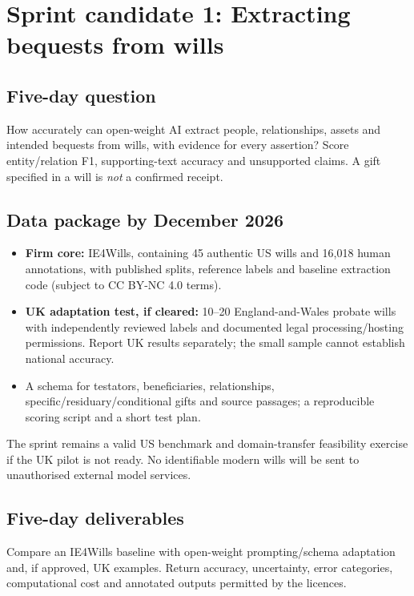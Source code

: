 \section{Sprint candidate 1: Extracting bequests from wills}
\label{sec:wills}

\subsection{Five-day question}
How accurately can open-weight AI extract people, relationships, assets and intended bequests from wills, with evidence for every assertion? Score entity/relation F1, supporting-text accuracy and unsupported claims. A gift specified in a will is \emph{not} a confirmed receipt.

\subsection{Data package by December 2026}
\begin{itemize}[nosep]
\item \textbf{Firm core:} IE4Wills, containing 45 authentic US wills and 16,018 human annotations, with published splits, reference labels and baseline extraction code (subject to CC BY-NC 4.0 terms).
\item \textbf{UK adaptation test, if cleared:} 10--20 England-and-Wales probate wills with independently reviewed labels and documented legal processing/hosting permissions. Report UK results separately; the small sample cannot establish national accuracy.
\item A schema for testators, beneficiaries, relationships, specific/residuary/conditional gifts and source passages; a reproducible scoring script and a short test plan.
\end{itemize}

The sprint remains a valid US benchmark and domain-transfer feasibility exercise if the UK pilot is not ready. No identifiable modern wills will be sent to unauthorised external model services.

\subsection{Five-day deliverables}
Compare an IE4Wills baseline with open-weight prompting/schema adaptation and, if approved, UK examples. Return accuracy, uncertainty, error categories, computational cost and annotated outputs permitted by the licences.

